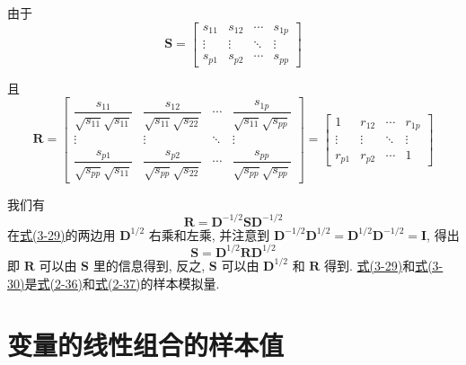 由于
\[
\mathbf{S}=\begin{bmatrix}
s_{11}&s_{12}&\cdots&s_{1p}\\
\vdots&\vdots&\ddots&\vdots\\
s_{p1}&s_{p2}&\cdots&s_{pp}
\end{bmatrix}
\]

且
\[
\mathbf{R}=\begin{bmatrix}
\dfrac{s_{11}}{\sqrt{s_{11}}\sqrt{s_{11}}}&\dfrac{s_{12}}{\sqrt{s_{11}}\sqrt{s_{22}}}&\cdots&\dfrac{s_{1p}}{\sqrt{s_{11}}\sqrt{s_{pp}}}\\[2mm]
\vdots&\vdots&\ddots&\vdots\\[2mm]
\dfrac{s_{p1}}{\sqrt{s_{pp}}\sqrt{s_{11}}}&\dfrac{s_{p2}}{\sqrt{s_{pp}}\sqrt{s_{22}}}&\cdots&\dfrac{s_{pp}}{\sqrt{s_{pp}}\sqrt{s_{pp}}}
\end{bmatrix}
=\begin{bmatrix}
1&r_{12}&\cdots&r_{1p}\\
\vdots&\vdots&\ddots&\vdots\\
r_{p1}&r_{p2}&\cdots&1
\end{bmatrix}
\]

我们有
\label{eq:3-29}
\begin{equation}
\mathbf{R}=\mathbf{D}^{-1/2}\mathbf{S}\mathbf{D}^{-1/2} \tag{3-29}
\end{equation}
在\hyperref[eq:3-29]{式(3-29)}的两边用 $\mathbf{D}^{1/2}$ 右乘和左乘, 并注意到 $\mathbf{D}^{-1/2}\mathbf{D}^{1/2}=\mathbf{D}^{1/2}\mathbf{D}^{-1/2}=\mathbf{I}$, 得出
\label{eq:3-30}
\begin{equation}
\mathbf{S}=\mathbf{D}^{1/2}\mathbf{R}\mathbf{D}^{1/2} \tag{3-30}
\end{equation}
即 $\mathbf{R}$ 可以由 $\mathbf{S}$ 里的信息得到, 反之, $\mathbf{S}$ 可以由 $\mathbf{D}^{1/2}$ 和 $\mathbf{R}$ 得到. \hyperref[eq:3-29]{式(3-29)}和\hyperref[eq:3-30]{式(3-30)}是\hyperref[eq:2-36]{式(2-36)}和\hyperref[eq:2-37]{式(2-37)}的样本模拟量.

\section{变量的线性组合的样本值}
\label{sec:3.6}

